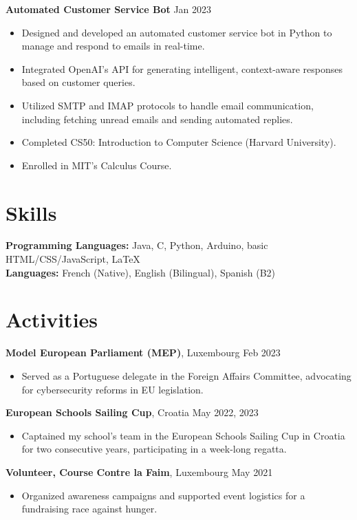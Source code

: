 \documentclass[10pt, letterpaper]{article}
\newenvironment{highlights}{
    \begin{itemize}[topsep=0.10cm, parsep=0.10cm, partopsep=0pt, itemsep=0pt, leftmargin=10pt]
}{
    \end{itemize}
}
\begin{document}
\textbf{Automated Customer Service Bot} \hfill Jan 2023 \\
\begin{highlights}
    \item Designed and developed an automated customer service bot in Python to manage and respond to emails in real-time.
    \item Integrated OpenAI's API for generating intelligent, context-aware responses based on customer queries.
    \item Utilized SMTP and IMAP protocols to handle email communication, including fetching unread emails and sending automated replies.
\end{highlights}

\begin{highlights}
    \item Completed CS50: Introduction to Computer Science (Harvard University).
    \item Enrolled in MIT's Calculus Course.
\end{highlights}

\section{Skills}
\textbf{Programming Languages:} Java, C, Python, Arduino, basic HTML/CSS/JavaScript, LaTeX \\
\textbf{Languages:} French (Native), English (Bilingual), Spanish (B2)

\section{Activities}

\textbf{Model European Parliament (MEP)}, Luxembourg \hfill Feb 2023 \\
\begin{highlights}
    \item Served as a Portuguese delegate in the Foreign Affairs Committee, advocating for cybersecurity reforms in EU legislation.
\end{highlights}

\textbf{European Schools Sailing Cup}, Croatia \hfill May 2022, 2023 \\
\begin{highlights}
    \item Captained my school’s team in the European Schools Sailing Cup in Croatia for two consecutive years, participating in a week-long regatta.
\end{highlights}

\textbf{Volunteer, Course Contre la Faim}, Luxembourg \hfill May 2021 \\
\begin{highlights}
    \item Organized awareness campaigns and supported event logistics for a fundraising race against hunger.
\end{highlights}
\end{document}
